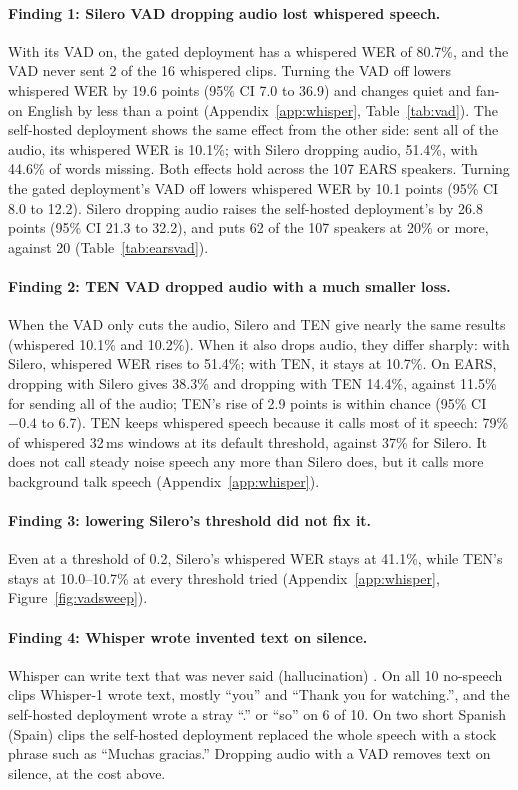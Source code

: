 \documentclass[11pt]{article}
\begin{document}
\paragraph{Finding 1: Silero VAD dropping audio lost whispered speech.} With its VAD on, the gated deployment has a whispered WER of 80.7\%, and the VAD never sent 2 of the 16 whispered clips. Turning the VAD off lowers whispered WER by 19.6 points (95\% CI 7.0 to 36.9) and changes quiet and fan-on English by less than a point (Appendix~\ref{app:whisper}, Table~\ref{tab:vad}). The self-hosted deployment shows the same effect from the other side: sent all of the audio, its whispered WER is 10.1\%; with Silero dropping audio, 51.4\%, with 44.6\% of words missing. Both effects hold across the 107 EARS speakers. Turning the gated deployment's VAD off lowers whispered WER by 10.1 points (95\% CI 8.0 to 12.2). Silero dropping audio raises the self-hosted deployment's by 26.8 points (95\% CI 21.3 to 32.2), and puts 62 of the 107 speakers at 20\% or more, against 20 (Table~\ref{tab:earsvad}).

\paragraph{Finding 2: TEN VAD dropped audio with a much smaller loss.} When the VAD only cuts the audio, Silero and TEN give nearly the same results (whispered 10.1\% and 10.2\%). When it also drops audio, they differ sharply: with Silero, whispered WER rises to 51.4\%; with TEN, it stays at 10.7\%. On EARS, dropping with Silero gives 38.3\% and dropping with TEN 14.4\%, against 11.5\% for sending all of the audio; TEN's rise of 2.9 points is within chance (95\% CI $-0.4$ to 6.7). TEN keeps whispered speech because it calls most of it speech: 79\% of whispered 32\,ms windows at its default threshold, against 37\% for Silero. It does not call steady noise speech any more than Silero does, but it calls more background talk speech (Appendix~\ref{app:whisper}).

\paragraph{Finding 3: lowering Silero's threshold did not fix it.} Even at a threshold of 0.2, Silero's whispered WER stays at 41.1\%, while TEN's stays at 10.0--10.7\% at every threshold tried (Appendix~\ref{app:whisper}, Figure~\ref{fig:vadsweep}).

\paragraph{Finding 4: Whisper wrote invented text on silence.} Whisper can write text that was never said (hallucination) \citep{koenecke2024careless,mansoor2025mitigating}. On all 10 no-speech clips Whisper-1 wrote text, mostly ``you'' and ``Thank you for watching.'', and the self-hosted deployment wrote a stray ``.'' or ``so'' on 6 of 10. On two short Spanish (Spain) clips the self-hosted deployment replaced the whole speech with a stock phrase such as ``Muchas gracias.'' Dropping audio with a VAD removes text on silence, at the cost above.
\end{document}
